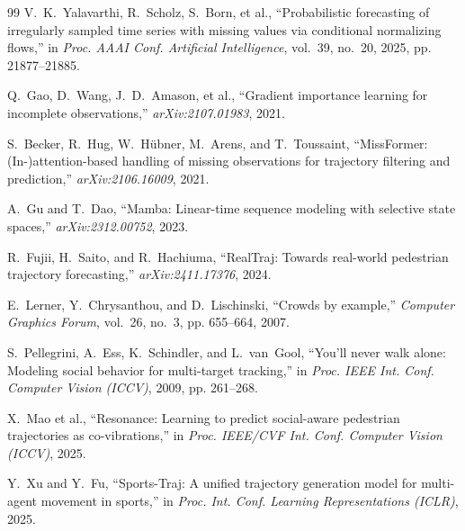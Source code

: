 \begin{thebibliography}{99}
V.~K.~Yalavarthi, R.~Scholz, S.~Born, et al., ``Probabilistic forecasting of irregularly sampled time series with missing values via conditional normalizing flows,'' in \emph{Proc. AAAI Conf. Artificial Intelligence}, vol.~39, no.~20, 2025, pp. 21877--21885.

Q.~Gao, D.~Wang, J.~D.~Amason, et al., ``Gradient importance learning for incomplete observations,'' \emph{arXiv:2107.01983}, 2021.

S.~Becker, R.~Hug, W.~H\"ubner, M.~Arens, and T.~Toussaint, ``MissFormer: (In-)attention-based handling of missing observations for trajectory filtering and prediction,'' \emph{arXiv:2106.16009}, 2021.

A.~Gu and T.~Dao, ``Mamba: Linear-time sequence modeling with selective state spaces,'' \emph{arXiv:2312.00752}, 2023.

R.~Fujii, H.~Saito, and R.~Hachiuma, ``RealTraj: Towards real-world pedestrian trajectory forecasting,'' \emph{arXiv:2411.17376}, 2024.

E.~Lerner, Y.~Chrysanthou, and D.~Lischinski, ``Crowds by example,'' \emph{Computer Graphics Forum}, vol.~26, no.~3, pp. 655--664, 2007.

S.~Pellegrini, A.~Ess, K.~Schindler, and L.~van~Gool, ``You'll never walk alone: Modeling social behavior for multi-target tracking,'' in \emph{Proc. IEEE Int. Conf. Computer Vision (ICCV)}, 2009, pp. 261--268.

X.~Mao et al., ``Resonance: Learning to predict social-aware pedestrian trajectories as co-vibrations,'' in \emph{Proc. IEEE/CVF Int. Conf. Computer Vision (ICCV)}, 2025.

Y.~Xu and Y.~Fu, ``Sports-Traj: A unified trajectory generation model for multi-agent movement in sports,'' in \emph{Proc. Int. Conf. Learning Representations (ICLR)}, 2025.

\end{thebibliography}

